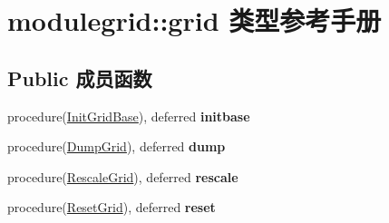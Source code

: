 \hypertarget{structmodulegrid_1_1grid}{}\section{modulegrid\+::grid 类型参考手册}
\label{structmodulegrid_1_1grid}
\subsection*{Public 成员函数}
\begin{DoxyCompactItemize}
\item 
\mbox{\label{structmodulegrid_1_1grid_a2ef2485f5f69a098b7a9d40bf9e4ccf0}} 
procedure(\mbox{\hyperlink{interfacemodulegrid_1_1_init_grid_base}{Init\+Grid\+Base}}), deferred {\bfseries initbase}
\item 
\mbox{\label{structmodulegrid_1_1grid_ade17b551663be4490b4c1764012d6db6}} 
procedure(\mbox{\hyperlink{interfacemodulegrid_1_1_dump_grid}{Dump\+Grid}}), deferred {\bfseries dump}
\item 
\mbox{\label{structmodulegrid_1_1grid_a149810804dd11040e0285a542748a9d0}} 
procedure(\mbox{\hyperlink{interfacemodulegrid_1_1_rescale_grid}{Rescale\+Grid}}), deferred {\bfseries rescale}
\item 
\mbox{\label{structmodulegrid_1_1grid_af5b5dce63255de466dfa111bc9799694}} 
procedure(\mbox{\hyperlink{interfacemodulegrid_1_1_reset_grid}{Reset\+Grid}}), deferred {\bfseries reset}
\end{DoxyCompactItemize}

